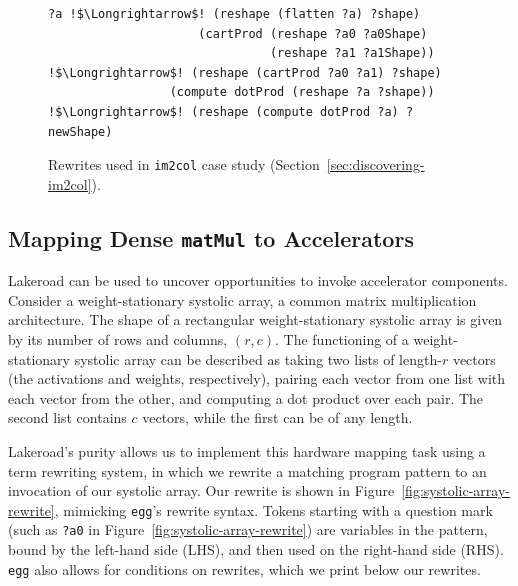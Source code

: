 \documentclass[prologue, dvipsnames, sigplan, screen, review, anonymous]{acmart}
\newcommand{\g}{Lakeroad\xspace}
\newcommand{\itc}{\texttt{im2col}\xspace}
\newcommand{\tcd}[1]{\texttt{#1}}
\begin{document}
\begin{figure}
\begin{lstlisting}[escapechar=!]
                                                    ?a !$\Longrightarrow$! (reshape (flatten ?a) ?shape) 
                     (cartProd (reshape ?a0 ?a0Shape)   
                               (reshape ?a1 ?a1Shape)) !$\Longrightarrow$! (reshape (cartProd ?a0 ?a1) ?shape)
                 (compute dotProd (reshape ?a ?shape)) !$\Longrightarrow$! (reshape (compute dotProd ?a) ?newShape)
\end{lstlisting}
\caption{Rewrites used in \itc case study (Section~\ref{sec:discovering-im2col}).}
\label{fig:im2col-rewrites}
\end{figure}

\subsection{Mapping Dense \tcd{matMul} to Accelerators}
\label{sec:case-study-tensorization}


\g can be used to uncover opportunities
  to invoke accelerator components.
Consider a 
  weight-stationary systolic array,
  a common matrix multiplication
  architecture.
The shape of a
  rectangular
  weight-stationary
  systolic array
  is given by its
  number of rows and columns,
  $(r,c)$.
The functioning
  of a weight-stationary
  systolic array
  can be described as
  taking two lists
  of length-$r$ vectors
  (the activations
    and weights, respectively),
  pairing each vector
  from one list
  with each vector
  from the other,
  and computing a dot product
  over each pair.
The second list
  contains $c$ vectors,
  while the first
  can be of any length.
  
\g's purity
  allows us to implement this hardware mapping task
  using a term rewriting system,
  in which we rewrite a matching program pattern
  to an invocation of our systolic array.
Our rewrite is shown in 
  Figure~\ref{fig:systolic-array-rewrite},
  mimicking
  \tcd{egg}'s rewrite syntax.
Tokens starting with a question mark
  (such as \texttt{?a0} in 
  Figure~\ref{fig:systolic-array-rewrite})
  are variables in the pattern,
  bound by the left-hand side (LHS),
  and then used on the right-hand side (RHS).
\tcd{egg} also allows for
  conditions on rewrites,
  which we print below our rewrites.
\end{document}
